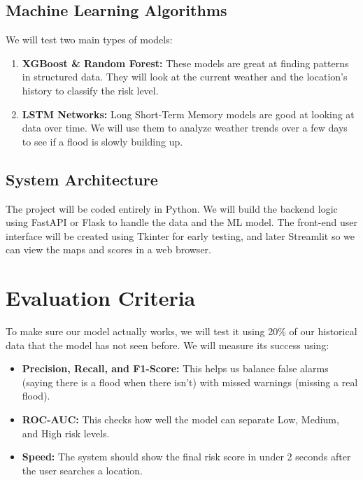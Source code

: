 \documentclass[11pt,a4paper]{article}
\begin{document}
\subsection{Machine Learning Algorithms}
We will test two main types of models:
\begin{enumerate}[noitemsep]
    \item \textbf{XGBoost \& Random Forest:} These models are great at finding patterns in structured data. They will look at the current weather and the location's history to classify the risk level.
    \item \textbf{LSTM Networks:} Long Short-Term Memory models are good at looking at data over time. We will use them to analyze weather trends over a few days to see if a flood is slowly building up.
\end{enumerate}

\subsection{System Architecture}
The project will be coded entirely in Python. We will build the backend logic using FastAPI or Flask to handle the data and the ML model. The front-end user interface will be created using Tkinter for early testing, and later Streamlit so we can view the maps and scores in a web browser.

\section{Evaluation Criteria}
To make sure our model actually works, we will test it using 20\% of our historical data that the model has not seen before. We will measure its success using:
\begin{itemize}[noitemsep]
    \item \textbf{Precision, Recall, and F1-Score:} This helps us balance false alarms (saying there is a flood when there isn't) with missed warnings (missing a real flood).
    \item \textbf{ROC-AUC:} This checks how well the model can separate Low, Medium, and High risk levels.
    \item \textbf{Speed:} The system should show the final risk score in under 2 seconds after the user searches a location.
\end{itemize}
\end{document}
